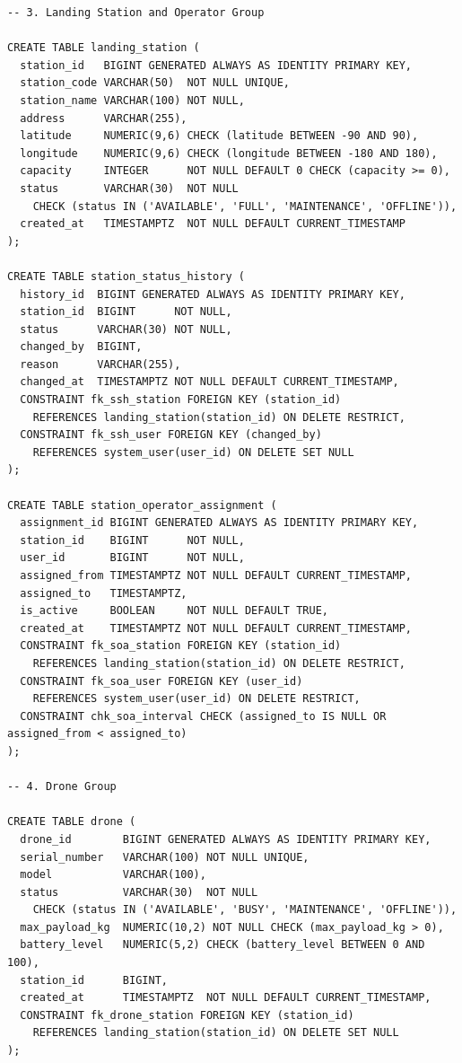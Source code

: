 \begin{verbatim}
-- 3. Landing Station and Operator Group

CREATE TABLE landing_station (
  station_id   BIGINT GENERATED ALWAYS AS IDENTITY PRIMARY KEY,
  station_code VARCHAR(50)  NOT NULL UNIQUE,
  station_name VARCHAR(100) NOT NULL,
  address      VARCHAR(255),
  latitude     NUMERIC(9,6) CHECK (latitude BETWEEN -90 AND 90),
  longitude    NUMERIC(9,6) CHECK (longitude BETWEEN -180 AND 180),
  capacity     INTEGER      NOT NULL DEFAULT 0 CHECK (capacity >= 0),
  status       VARCHAR(30)  NOT NULL
    CHECK (status IN ('AVAILABLE', 'FULL', 'MAINTENANCE', 'OFFLINE')),
  created_at   TIMESTAMPTZ  NOT NULL DEFAULT CURRENT_TIMESTAMP
);

CREATE TABLE station_status_history (
  history_id  BIGINT GENERATED ALWAYS AS IDENTITY PRIMARY KEY,
  station_id  BIGINT      NOT NULL,
  status      VARCHAR(30) NOT NULL,
  changed_by  BIGINT,
  reason      VARCHAR(255),
  changed_at  TIMESTAMPTZ NOT NULL DEFAULT CURRENT_TIMESTAMP,
  CONSTRAINT fk_ssh_station FOREIGN KEY (station_id)
    REFERENCES landing_station(station_id) ON DELETE RESTRICT,
  CONSTRAINT fk_ssh_user FOREIGN KEY (changed_by)
    REFERENCES system_user(user_id) ON DELETE SET NULL
);

CREATE TABLE station_operator_assignment (
  assignment_id BIGINT GENERATED ALWAYS AS IDENTITY PRIMARY KEY,
  station_id    BIGINT      NOT NULL,
  user_id       BIGINT      NOT NULL,
  assigned_from TIMESTAMPTZ NOT NULL DEFAULT CURRENT_TIMESTAMP,
  assigned_to   TIMESTAMPTZ,
  is_active     BOOLEAN     NOT NULL DEFAULT TRUE,
  created_at    TIMESTAMPTZ NOT NULL DEFAULT CURRENT_TIMESTAMP,
  CONSTRAINT fk_soa_station FOREIGN KEY (station_id)
    REFERENCES landing_station(station_id) ON DELETE RESTRICT,
  CONSTRAINT fk_soa_user FOREIGN KEY (user_id)
    REFERENCES system_user(user_id) ON DELETE RESTRICT,
  CONSTRAINT chk_soa_interval CHECK (assigned_to IS NULL OR assigned_from < assigned_to)
);

-- 4. Drone Group

CREATE TABLE drone (
  drone_id        BIGINT GENERATED ALWAYS AS IDENTITY PRIMARY KEY,
  serial_number   VARCHAR(100) NOT NULL UNIQUE,
  model           VARCHAR(100),
  status          VARCHAR(30)  NOT NULL
    CHECK (status IN ('AVAILABLE', 'BUSY', 'MAINTENANCE', 'OFFLINE')),
  max_payload_kg  NUMERIC(10,2) NOT NULL CHECK (max_payload_kg > 0),
  battery_level   NUMERIC(5,2) CHECK (battery_level BETWEEN 0 AND 100),
  station_id      BIGINT,
  created_at      TIMESTAMPTZ  NOT NULL DEFAULT CURRENT_TIMESTAMP,
  CONSTRAINT fk_drone_station FOREIGN KEY (station_id)
    REFERENCES landing_station(station_id) ON DELETE SET NULL
);


\end{verbatim}
